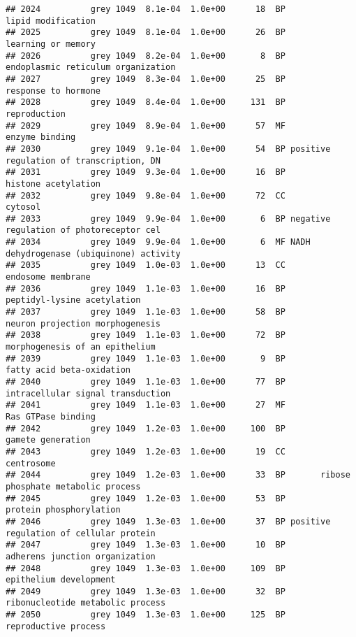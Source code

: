 \documentclass[]{article}
\begin{document}
\begin{verbatim}
## 2024          grey 1049  8.1e-04  1.0e+00      18  BP                       lipid modification
## 2025          grey 1049  8.1e-04  1.0e+00      26  BP                       learning or memory
## 2026          grey 1049  8.2e-04  1.0e+00       8  BP       endoplasmic reticulum organization
## 2027          grey 1049  8.3e-04  1.0e+00      25  BP                      response to hormone
## 2028          grey 1049  8.4e-04  1.0e+00     131  BP                             reproduction
## 2029          grey 1049  8.9e-04  1.0e+00      57  MF                           enzyme binding
## 2030          grey 1049  9.1e-04  1.0e+00      54  BP positive regulation of transcription, DN
## 2031          grey 1049  9.3e-04  1.0e+00      16  BP                      histone acetylation
## 2032          grey 1049  9.8e-04  1.0e+00      72  CC                                  cytosol
## 2033          grey 1049  9.9e-04  1.0e+00       6  BP negative regulation of photoreceptor cel
## 2034          grey 1049  9.9e-04  1.0e+00       6  MF NADH dehydrogenase (ubiquinone) activity
## 2035          grey 1049  1.0e-03  1.0e+00      13  CC                        endosome membrane
## 2036          grey 1049  1.1e-03  1.0e+00      16  BP              peptidyl-lysine acetylation
## 2037          grey 1049  1.1e-03  1.0e+00      58  BP          neuron projection morphogenesis
## 2038          grey 1049  1.1e-03  1.0e+00      72  BP           morphogenesis of an epithelium
## 2039          grey 1049  1.1e-03  1.0e+00       9  BP                fatty acid beta-oxidation
## 2040          grey 1049  1.1e-03  1.0e+00      77  BP        intracellular signal transduction
## 2041          grey 1049  1.1e-03  1.0e+00      27  MF                       Ras GTPase binding
## 2042          grey 1049  1.2e-03  1.0e+00     100  BP                        gamete generation
## 2043          grey 1049  1.2e-03  1.0e+00      19  CC                               centrosome
## 2044          grey 1049  1.2e-03  1.0e+00      33  BP       ribose phosphate metabolic process
## 2045          grey 1049  1.2e-03  1.0e+00      53  BP                  protein phosphorylation
## 2046          grey 1049  1.3e-03  1.0e+00      37  BP positive regulation of cellular protein 
## 2047          grey 1049  1.3e-03  1.0e+00      10  BP           adherens junction organization
## 2048          grey 1049  1.3e-03  1.0e+00     109  BP                   epithelium development
## 2049          grey 1049  1.3e-03  1.0e+00      32  BP         ribonucleotide metabolic process
## 2050          grey 1049  1.3e-03  1.0e+00     125  BP                     reproductive process

\end{verbatim}
\end{document}
